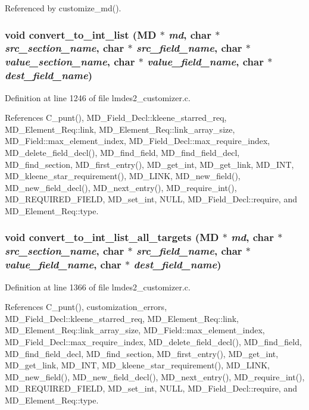 Referenced by customize\_\-md().
\subsubsection{\setlength{\rightskip}{0pt plus 5cm}void convert\_\-to\_\-int\_\-list (\bf{MD} $\ast$ {\em md}, char $\ast$ {\em src\_\-section\_\-name}, char $\ast$ {\em src\_\-field\_\-name}, char $\ast$ {\em value\_\-section\_\-name}, char $\ast$ {\em value\_\-field\_\-name}, char $\ast$ {\em dest\_\-field\_\-name})}\label{lmdes2__customizer_8c_21573698051dc7050183b82a6f62e003}




Definition at line 1246 of file lmdes2\_\-customizer.c.

References C\_\-punt(), MD\_\-Field\_\-Decl::kleene\_\-starred\_\-req, MD\_\-Element\_\-Req::link, MD\_\-Element\_\-Req::link\_\-array\_\-size, MD\_\-Field::max\_\-element\_\-index, MD\_\-Field\_\-Decl::max\_\-require\_\-index, MD\_\-delete\_\-field\_\-decl(), MD\_\-find\_\-field, MD\_\-find\_\-field\_\-decl, MD\_\-find\_\-section, MD\_\-first\_\-entry(), MD\_\-get\_\-int, MD\_\-get\_\-link, MD\_\-INT, MD\_\-kleene\_\-star\_\-requirement(), MD\_\-LINK, MD\_\-new\_\-field(), MD\_\-new\_\-field\_\-decl(), MD\_\-next\_\-entry(), MD\_\-require\_\-int(), MD\_\-REQUIRED\_\-FIELD, MD\_\-set\_\-int, NULL, MD\_\-Field\_\-Decl::require, and MD\_\-Element\_\-Req::type.
\subsubsection{\setlength{\rightskip}{0pt plus 5cm}void convert\_\-to\_\-int\_\-list\_\-all\_\-targets (\bf{MD} $\ast$ {\em md}, char $\ast$ {\em src\_\-section\_\-name}, char $\ast$ {\em src\_\-field\_\-name}, char $\ast$ {\em value\_\-field\_\-name}, char $\ast$ {\em dest\_\-field\_\-name})}\label{lmdes2__customizer_8c_634270b643e7deeab2184f71ca619024}




Definition at line 1366 of file lmdes2\_\-customizer.c.

References C\_\-punt(), customization\_\-errors, MD\_\-Field\_\-Decl::kleene\_\-starred\_\-req, MD\_\-Element\_\-Req::link, MD\_\-Element\_\-Req::link\_\-array\_\-size, MD\_\-Field::max\_\-element\_\-index, MD\_\-Field\_\-Decl::max\_\-require\_\-index, MD\_\-delete\_\-field\_\-decl(), MD\_\-find\_\-field, MD\_\-find\_\-field\_\-decl, MD\_\-find\_\-section, MD\_\-first\_\-entry(), MD\_\-get\_\-int, MD\_\-get\_\-link, MD\_\-INT, MD\_\-kleene\_\-star\_\-requirement(), MD\_\-LINK, MD\_\-new\_\-field(), MD\_\-new\_\-field\_\-decl(), MD\_\-next\_\-entry(), MD\_\-require\_\-int(), MD\_\-REQUIRED\_\-FIELD, MD\_\-set\_\-int, NULL, MD\_\-Field\_\-Decl::require, and MD\_\-Element\_\-Req::type.

